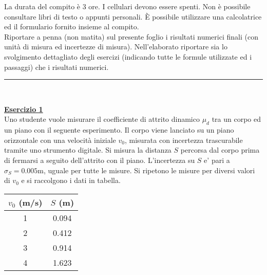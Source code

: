 \documentclass[10pt,a4paper,fleqn]{article}
\begin{document}
La durata del compito \`e 3 ore. I cellulari devono essere spenti. Non \`e possibile consultare libri
di testo o appunti personali. \`E possibile utilizzare una
calcolatrice ed il formulario fornito insieme al compito. \\
Riportare a penna (non matita) sul presente foglio i risultati
numerici finali (con unit\`a di misura
ed incertezze di misura). Nell'elaborato riportare sia lo svolgimento
dettagliato degli esercizi (indicando tutte le formule utilizzate ed i passaggi) che i risultati numerici. 

\vspace{0.3cm}
\noindent\rule{18cm}{0.4pt}  \\

\enlargethispage{0.2cm}
\normalsize


\vskip0.30cm {\bf \underline {Esercizio 1}} \\
Uno studente vuole misurare il coefficiente di attrito dinamico $\mu_d$ tra un
corpo ed un piano con il seguente esperimento. Il corpo viene lanciato
su un piano orizzontale con una velocit\`a iniziale $v_0$,
misurata con incertezza trascurabile tramite uno strumento
digitale. Si misura la distanza $S$ percorsa dal corpo prima di
fermarsi a seguito dell'attrito con il piano. L'incertezza su $S$ e'
pari a $\sigma_S=0.005$m, uguale per tutte le misure. Si ripetono le
misure per diversi valori di $v_0$ e si raccolgono i dati in tabella.
\begin{table}[h]
\begin{tabular}{|c|c|}
\hline
$v_0$ (m/s) & $S$ (m) \\
\hline
1 & 0.094 \\ 
2 & 0.412 \\
3 & 0.914 \\
4 & 1.623 \\
\hline
\end{tabular}
\end{table}
\end{document}
